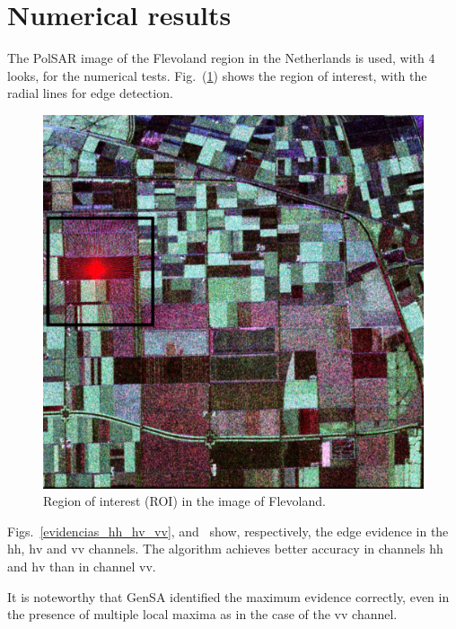\documentclass[conference]{IEEEtran}
\begin{document}
\section{Numerical results}\label{sec_08}

The PolSAR image of the Flevoland region in the Netherlands is used, with $4$ looks, for the numerical tests. 
Fig.~(\ref{flevoland_radial_4look}) shows the region of interest, with the radial lines for edge detection.

\begin{figure}[hbt]
\centering
	\includegraphics[width=\linewidth]{flevoland_radial_4_look_black}
	\caption{Region of interest (ROI) in the image of Flevoland.}
\label{flevoland_radial_4look}
\end{figure}

Figs.~\ref{evidencias_hh_hv_vv},  and~ show, respectively, the edge evidence in the $\text{hh}$, $\text{hv}$ and $\text{vv}$ channels. 
The algorithm achieves better accuracy in channels $\text{hh}$ and $\text{hv}$ than in channel $\text{vv}$.  

It is noteworthy that GenSA identified the maximum evidence correctly, even in the presence of multiple local maxima as in the case of the $\text{vv}$ channel.
\end{document}
